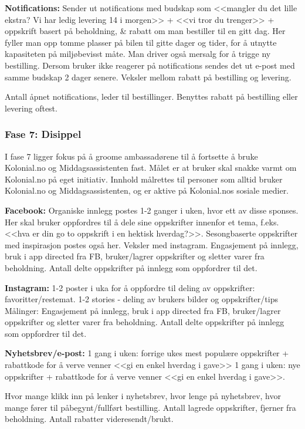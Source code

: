 \textbf{Notifications:} Sender ut notifications med budskap som <<mangler du det lille ekstra? Vi har ledig levering 14 i morgen>> + <<vi tror du trenger>> + oppskrift basert på beholdning, & rabatt om man bestiller til en gitt dag. Her fyller man opp tomme plasser på bilen til gitte dager og tider, for å utnytte kapasiteten på miljøbevisst måte. Man driver også mersalg for å trigge ny bestilling. Dersom bruker ikke reagerer på notifications sendes det ut e-post med samme budskap 2 dager senere. Veksler mellom rabatt på bestilling og levering. 

 Antall åpnet notifications, leder til bestillinger. Benyttes rabatt på bestilling eller levering oftest. 

\subsubsection{\textbf{Fase 7: Disippel}}
I fase 7 ligger fokus på å groome ambassadørene til å fortsette å bruke Kolonial.no og Middagsassistenten fast. Målet er at bruker skal snakke varmt om Kolonial.no på eget initiativ. Innhold målrettes til personer som alltid bruker Kolonial.no og Middagsassistenten, og er aktive på Kolonial.nos sosiale medier. 

\textbf{Facebook:} Organiske innlegg postes 1-2 ganger i uken, hvor ett av disse sponses. Her skal bruker oppfordres til å dele sine oppskrifter innenfor et tema, f.eks. <<hva er din go to oppskrift i en hektisk hverdag?>>. Sesongbaserte oppskrifter med inspirasjon postes også her. Veksler med instagram. 
 Engasjement på innlegg, bruk i app directed fra FB, bruker/lagrer oppskrifter og sletter varer fra beholdning. Antall delte oppskrifter på innlegg som oppfordrer til det. 

\textbf{Instagram:} 1-2 poster i uka for å oppfordre til deling av oppskrifter: favoritter/restemat. 1-2 stories - deling av brukers bilder og oppskrifter/tips
Målinger: Engasjement på innlegg, bruk i app directed fra FB, bruker/lagrer oppskrifter og sletter varer fra beholdning. Antall delte oppskrifter på innlegg som oppfordrer til det. 

\textbf{Nyhetsbrev/e-post:} 1 gang i uken: forrige ukes mest populære oppskrifter + rabattkode for å verve venner <<gi en enkel hverdag i gave>>
1 gang i uken: nye oppskrifter + rabattkode for å verve venner <<gi en enkel hverdag i gave>>.

 Hvor mange klikk inn på lenker i nyhetsbrev, hvor lenge på nyhetsbrev, hvor mange fører til påbegynt/fullført bestilling. Antall lagrede oppskrifter, fjerner fra beholdning. Antall rabatter videresendt/brukt. 